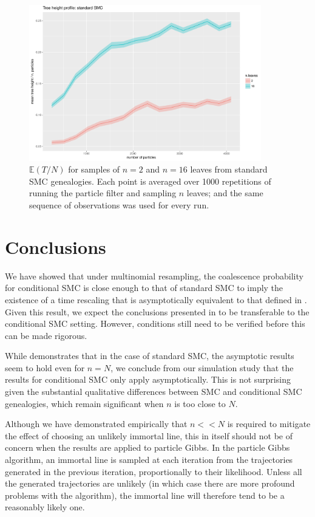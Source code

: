 \documentclass{article}
\newcommand{\E}{\mathbb{E}}
\begin{document}
\begin{figure}
\centering
\includegraphics[width=0.9\textwidth]{treeht_std_1000reps.pdf}
\caption{$\E(T/N)$ for samples of $n=2$ and $n=16$ leaves from standard SMC genealogies. Each point is averaged over 1000 repetitions of running the particle filter and sampling $n$ leaves; and the same sequence of observations was used for every run.}
\label{fig:standardSMC}
\end{figure}

\section{Conclusions}
We have showed that under multinomial resampling, the coalescence probability for conditional SMC is close enough to that of standard SMC to imply the existence of a time rescaling that is asymptotically equivalent to that defined in \citet[p.7]{koskela2018}. Given this result, we expect the conclusions presented in \citet{koskela2018} to be transferable to the conditional SMC setting. However, conditions \citet[(3)--(4)]{koskela2018} still need to be verified before this can be made rigorous.

While \citet[Section 3]{koskela2018} demonstrates that in the case of standard SMC, the asymptotic results seem to hold even for $n=N$, we conclude from our simulation study that the results for conditional SMC only apply asymptotically. This is not surprising given the substantial qualitative differences between SMC and conditional SMC genealogies, which remain significant when $n$ is too close to $N$.

Although we have demonstrated empirically that $n <<N$ is required to mitigate the effect of choosing an unlikely immortal line, this in itself should not be of concern when the results are applied to particle Gibbs. In the particle Gibbs algorithm, an immortal line is sampled at each iteration from the trajectories generated in the previous iteration, proportionally to their likelihood. Unless all the generated trajectories are unlikely (in which case there are more profound problems with the algorithm), the immortal line will therefore tend to be a reasonably likely one.
\end{document}
